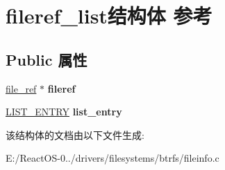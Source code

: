 \hypertarget{structfileref__list}{}\section{fileref\+\_\+list结构体 参考}
\label{structfileref__list}
\subsection*{Public 属性}
\begin{DoxyCompactItemize}
\item 
\mbox{\label{structfileref__list_a192696128ab64f697997a086774dbe7c}} 
\hyperlink{struct__file__ref}{file\+\_\+ref} $\ast$ {\bfseries fileref}
\item 
\mbox{\label{structfileref__list_a1b406a24f7c1bd459c25bec336f0c842}} 
\hyperlink{struct___l_i_s_t___e_n_t_r_y}{L\+I\+S\+T\+\_\+\+E\+N\+T\+RY} {\bfseries list\+\_\+entry}
\end{DoxyCompactItemize}


该结构体的文档由以下文件生成\+:\begin{DoxyCompactItemize}
\item 
E\+:/\+React\+O\+S-\/0../drivers/filesystems/btrfs/fileinfo.\+c\end{DoxyCompactItemize}
